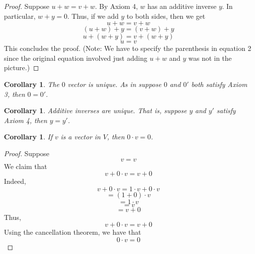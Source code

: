 \documentclass{article}
\newtheorem{corollary}[theorem]{Corollary}
\newtheorem{one minute paper}[theorem]{One Minute Paper}
\begin{document}
\begin{proof}
    Suppose $u + w = v + w$. By Axiom 4, $w$ has an additive inverse $y$. In particular, $w + y = 0$. Thus, if we add $y$ to both sides, then we get 
    \begin{equation}
        u + w = v + w
    \end{equation}
    \begin{equation}
        (u + w) + y = (v + w) + y
    \end{equation}
    \begin{equation}
        u + (w + y) = v + (w + y)
    \end{equation}
    \begin{equation}
        u = v
    \end{equation}
    This concludes the proof. 
    (Note: We have to specify the parenthesis in equation 2 since the original equation involved just adding $u + w$ and $y$ was not in the picture.) 
\end{proof}

\begin{corollary}
    The $0$ vector is unique. As in suppose $0$ and $0'$ both satisfy Axiom 3, then $0 = 0'$.
\end{corollary}

\begin{corollary}
    Additive inverses are unique. That is, suppose $y$ and $y'$ satisfy Axiom 4, then $y = y'$. 
\end{corollary}

\begin{corollary}
    If $v$ is a vector in $V$, then $0\cdot v = 0$. 
\end{corollary}

\begin{proof}
    Suppose
    \begin{equation}
        v = v
    \end{equation}
    We claim that 
    \begin{equation}
        v + 0 \cdot v = v + 0
    \end{equation}
    Indeed,
    \begin{equation}
        v + 0 \cdot v = 1 \cdot v + 0 \cdot v
    \end{equation}
    \begin{equation}
        = (1 + 0) \cdot v
    \end{equation}
    \begin{equation}
        = 1 \cdot v
    \end{equation}
    \begin{equation}
        = v
    \end{equation}
    \begin{equation}
        = v + 0
    \end{equation}
    Thus, 
    \begin{equation}
        v + 0 \cdot v = v + 0
    \end{equation}
    Using the cancellation theorem, we have that 
    \begin{equation}
        0 \cdot v = 0
    \end{equation}
\end{proof}
\end{document}
